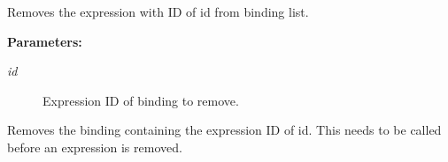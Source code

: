 Removes the expression with ID of id from binding list.

\begin{Desc}
\item[{\bf Parameters: }]\par
\begin{description}
\item[
{\em id}]Expression ID of binding to remove.

\end{description}
\end{Desc}
Removes the binding containing the expression ID of id. This needs to be called before an expression is removed. 